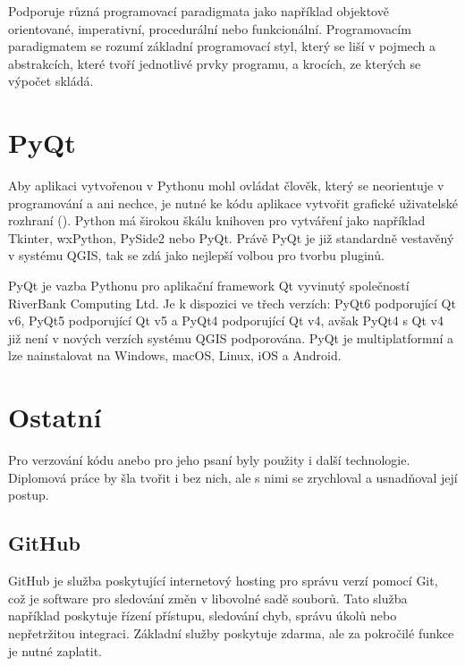 Podporuje různá programovací paradigmata
jako například objektově orientované, imperativní, procedurální nebo funkcionální.
Programovacím paradigmatem se rozumí základní programovací styl, který se liší v pojmech a abstrakcích,
které tvoří jednotlivé prvky programu, a krocích, ze kterých se výpočet skládá. \cite{wikipedia-paradigma} 
 
\section{PyQt}
Aby aplikaci vytvořenou v Pythonu mohl ovládat člověk, který se neorientuje v programování a ani nechce,
je nutné ke kódu aplikace vytvořit grafické uživatelské rozhraní (). Python má širokou škálu knihoven
pro vytváření  jako například Tkinter, wxPython, PySide2 nebo PyQt. Právě PyQt je již standardně 
vestavěný v systému QGIS, tak se zdá jako nejlepší volbou pro tvorbu pluginů.  

PyQt je vazba Pythonu pro aplikační framework Qt vyvinutý společností RiverBank Computing Ltd.
Je k dispozici ve třech verzích: PyQt6 podporující Qt v6, PyQt5 podporující Qt v5 a PyQt4 podporující Qt v4,
avšak PyQt4 s Qt v4 již není v nových verzích systému QGIS podporována. PyQt je multiplatformní a lze nainstalovat na Windows,
macOS, Linux, iOS a Android. \cite{pyqt}


\section{Ostatní}

Pro verzování kódu anebo pro jeho psaní byly použity i další technologie. Diplomová práce by šla tvořit i bez nich,
ale s nimi se zrychloval a usnadňoval její postup.

\subsection{GitHub}
\label{section-github}

GitHub je služba poskytující internetový hosting pro správu verzí pomocí Git, což je software pro sledování 
změn v libovolné sadě souborů. Tato služba například poskytuje řízení přístupu, sledování chyb, 
správu úkolů nebo nepřetržitou integraci. Základní služby poskytuje zdarma, ale za pokročilé funkce je nutné zaplatit.

